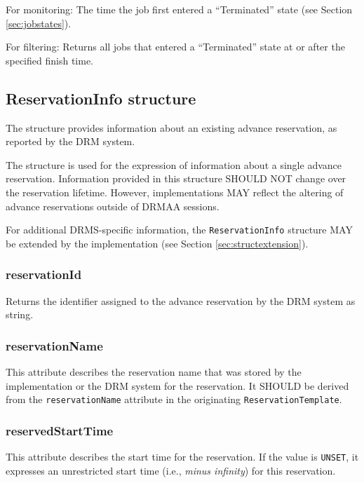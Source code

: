 \documentclass{article}
\newcommand{\h}[1]{\lstinline|#1|}
\begin{document}
For monitoring: The time the job first entered a \enquote{Terminated} state (see Section \ref{sec:jobstates}).

For filtering: Returns all jobs that entered a \enquote{Terminated} state at or after the specified finish time.

\subsection{ReservationInfo structure}
\label{sec:reservationinfo}

The structure provides information about an existing advance reservation, as reported by the DRM system.



The structure is used for the expression of information about a single advance reservation. Information provided in this structure SHOULD NOT change over the reservation lifetime. However, implementations MAY reflect the altering of advance reservations outside of DRMAA sessions.

For additional DRMS-specific information, the \h{ReservationInfo} structure MAY be extended by the implementation (see Section \ref{sec:structextension}).

\subsubsection{reservationId}

Returns the identifier assigned to the advance reservation by the DRM system as string.

\subsubsection{reservationName}

This attribute describes the reservation name that was stored by the implementation or the DRM system for the reservation. It SHOULD be derived from the \h{reservationName} attribute in the originating \h{ReservationTemplate}. 

\subsubsection{reservedStartTime}

This attribute describes the start time for the reservation. If the value is \h{UNSET}, it expresses an unrestricted start time (i.e., \emph{minus infinity}) for this reservation.
\end{document}
